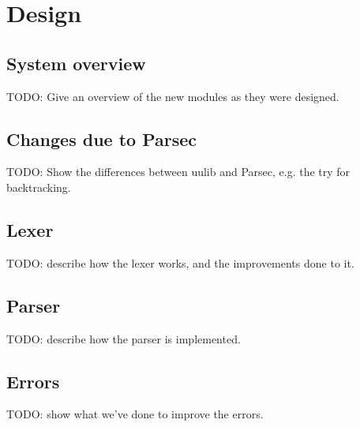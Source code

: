 
\section{Design}
\label{sec:design}

\subsection{System overview}
TODO: Give an overview of the new modules as they were designed.

\subsection{Changes due to Parsec}
TODO: Show the differences between uulib and Parsec, e.g. the try for backtracking.

\subsection{Lexer}
TODO: describe how the lexer works, and the improvements done to it.

\subsection{Parser}
TODO: describe how the parser is implemented.

\subsection{Errors}
TODO: show what we've done to improve the errors.
